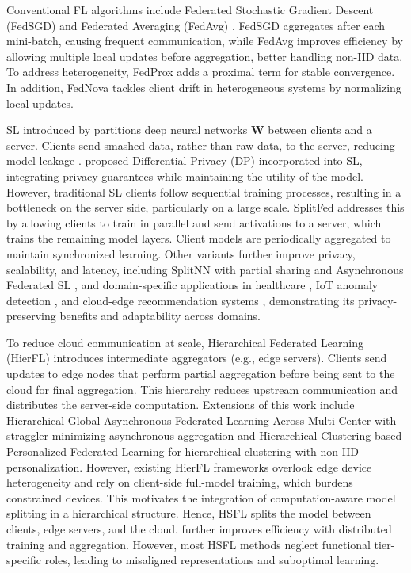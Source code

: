 \documentclass[letterpaper]{article} %
\begin{document}
    Conventional FL algorithms include Federated Stochastic Gradient Descent (FedSGD) and Federated Averaging (FedAvg) \cite{mcmahan2017communication}. FedSGD aggregates after each mini-batch, causing frequent communication, while FedAvg improves efficiency by allowing multiple local updates before aggregation, better handling non-IID data. To address heterogeneity, FedProx \cite{MLSYS2020_1f5fe839} adds a proximal term for stable convergence. In addition, FedNova \cite{10.5555/3495724.3496362} tackles client drift in heterogeneous systems by normalizing local updates. 
 
     SL introduced by \cite{GUPTA20181, vepakomma2019split} partitions deep neural networks $\mathbf{W}$ between clients and a server. Clients send smashed data, rather than raw data, to the server, reducing model leakage \cite{9756883}. \cite{10.1145/3320269.3384740} proposed Differential Privacy (DP) incorporated into SL, integrating privacy guarantees while maintaining the utility of the model. However, traditional SL clients follow sequential training processes, resulting in a bottleneck on the server side, particularly on a large scale. SplitFed \cite{thapa2022splitfed} addresses this by allowing clients to train in parallel and send activations to a server, which trains the remaining model layers. Client models are periodically aggregated to maintain synchronized learning. Other variants further improve privacy, scalability, and latency, including SplitNN with partial sharing \cite{vepakomma2019split} and Asynchronous Federated SL \cite{10707222}, and domain-specific applications in healthcare \cite{10746501}, IoT anomaly detection \cite{bdcc8030021}, and cloud-edge recommendation systems \cite{10.1186/s13677-023-00435-5}, demonstrating its privacy-preserving benefits and adaptability across domains.

     To reduce cloud communication at scale, Hierarchical Federated Learning (HierFL) introduces intermediate aggregators (e.g., edge servers)\cite{9148862}. Clients send updates to edge nodes that perform partial aggregation before being sent to the cloud for final aggregation. This hierarchy reduces upstream communication and distributes the server-side computation. Extensions of this work include Hierarchical Global Asynchronous Federated Learning Across Multi-Center \cite{pmlr-v260-xie25c} with straggler-minimizing asynchronous aggregation and Hierarchical Clustering-based Personalized Federated Learning \cite{10.1145/3580795} for hierarchical clustering with non-IID personalization. However, existing HierFL frameworks overlook edge device heterogeneity and rely on client-side full-model training, which burdens constrained devices. This motivates the integration of computation-aware model splitting in a hierarchical structure. Hence, HSFL \cite{10980018} splits the model between clients, edge servers, and the cloud. \cite{10251444} further improves efficiency with distributed training and aggregation. However, most HSFL methods neglect functional tier-specific roles, leading to misaligned representations and suboptimal learning.
\end{document}
